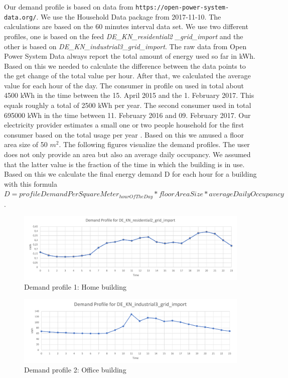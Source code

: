 Our demand profile is based on data from \texttt{https://open-power-system-data.org/}. We use the \glqq{}Household Data\grqq{} package from 2017-11-10. The calculations are based on the 60 minutes interval data set. We use two different profiles, one is based on the feed \textit{DE\_KN\_residential2 \_grid\_import} and the other is based on \textit{DE\_KN\_industrial3\_grid\_import}. The raw data from Open Power System Data always report the total amount of energy used so far in kWh. Based on this we needed to calculate the difference between the data points to the get change of the total value per hour. After that, we calculated the average value for each hour of the day. The consumer in profile on used in total about 4500 kWh in the time between the 15. April 2015 and the 1. February 2017. This equals roughly a total of 2500 kWh per year. The second consumer used in total 695000 kWh in the time between 11. February 2016 and 09. February 2017. Our electricity provider estimates a small one or two people household for the first consumer based on the total usage per year \cite{enbw}. Based on this we amused a floor area size of 50 $m^{2}$. The following figures visualize the demand profiles. The user does not only provide an area but also an average daily occupancy. We assumed that the latter value is the fraction of the time in which the building is in use. Based on this we calculate the final energy demand D for each hour for a building with this formula $ D = profileDemandPerSquareMeter_{hourOfTheDay} * floorAreaSize * averageDailyOccupancy$. 

\begin{figure}[!h]
	\centering
	\includegraphics[width=1.00\textwidth]{../figures/profile1.pdf}
	\caption{Demand profile 1: Home building}
	\label{fig:profile1}
\end{figure}

\begin{figure}[!h]
	\centering
	\includegraphics[width=1.00\textwidth]{../figures/profile2.pdf}
	\caption{Demand profile 2: Office building}
	\label{fig:profile2}
\end{figure}
